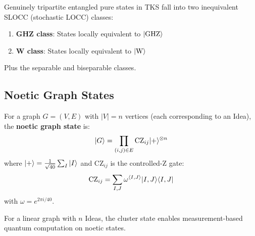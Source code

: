 \begin{theorem}
\label{thm:ghz-w-classes}
Genuinely tripartite entangled pure states in TKS fall into two inequivalent SLOCC (stochastic LOCC) classes:
\begin{enumerate}
  \item \textbf{GHZ class}: States locally equivalent to $|\mathrm{GHZ}\rangle$
  \item \textbf{W class}: States locally equivalent to $|\mathrm{W}\rangle$
\end{enumerate}
Plus the separable and biseparable classes.
\end{theorem}

\subsection{Noetic Graph States}

\begin{definition}
\label{def:graph-state}
For a graph $G = (V, E)$ with $|V| = n$ vertices (each corresponding to an Idea), the \textbf{noetic graph state} is:
\[
|G\rangle = \prod_{(i,j) \in E} \mathrm{CZ}_{ij} |+\rangle^{\otimes n}
\]
where $|+\rangle = \frac{1}{\sqrt{40}}\sum_I |I\rangle$ and $\mathrm{CZ}_{ij}$ is the controlled-Z gate:
\[
\mathrm{CZ}_{ij} = \sum_{I, J} \omega^{\langle I, J \rangle} |I, J\rangle\langle I, J|
\]
with $\omega = e^{2\pi i / 40}$.
\end{definition}

\begin{example}
\label{ex:cluster}
For a linear graph with $n$ Ideas, the cluster state enables measurement-based quantum computation on noetic states.
\end{example}

